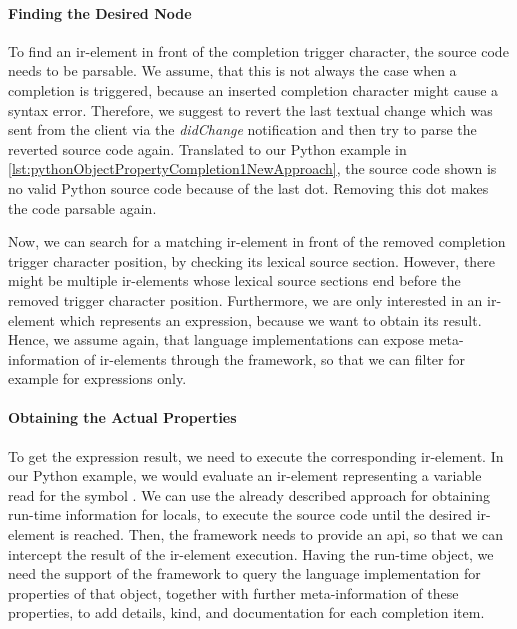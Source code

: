 \documentclass[sigplan,10pt,review,anonymous]{acmart}
\begin{document}
    \paragraph{Finding the Desired Node}
    To find an \ac{ir}-element in front of the completion trigger character, the source code needs to be parsable. We assume, that this is not always the case when a completion is triggered, because an inserted completion character might cause a syntax error. Therefore, we suggest to revert the last textual change which was sent from the client via the \emph{didChange} notification and then try to parse the reverted source code again. Translated to our Python example in \autoref{lst:pythonObjectPropertyCompletion1NewApproach}, the source code shown is no valid Python source code because of the last dot. Removing this dot makes the code parsable again.

    Now, we can search for a matching \ac{ir}-element in front of the removed completion trigger character position, by checking its lexical source section. However, there might be multiple \ac{ir}-elements whose lexical source sections end before the removed trigger character position. Furthermore, we are only interested in an \ac{ir}-element which represents an expression, because we want to obtain its result. Hence, we assume again, that language implementations can expose meta-information of \ac{ir}-elements through the framework, so that we can filter for example for expressions only.

    \paragraph{Obtaining the Actual Properties}
    To get the expression result, we need to execute the corresponding \ac{ir}-element. In our Python example, we would evaluate an \ac{ir}-element representing a variable read for the symbol . We can use the already described approach for obtaining run-time information for locals, to execute the source code until the desired \ac{ir}-element is reached. Then, the framework needs to provide an \ac{api}, so that we can intercept the result of the \ac{ir}-element execution. Having the run-time object, we need the support of the framework to query the language implementation for properties of that object, together with further meta-information of these properties, to add details, kind, and documentation for each completion item.
\end{document}
